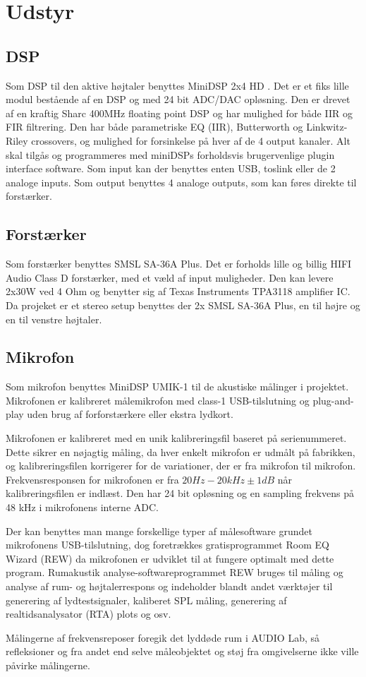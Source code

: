 \section{Udstyr}
\subsection{DSP}
Som DSP til den aktive højtaler benyttes MiniDSP 2x4 HD \cite{dsp}. Det er et fiks lille modul bestående af en DSP og med 24 bit ADC/DAC opløsning. Den er drevet af en kraftig Sharc 400MHz floating point DSP og har mulighed for både IIR og FIR filtrering. Den har både parametriske EQ (IIR), Butterworth og Linkwitz-Riley crossovers, og mulighed for forsinkelse på hver af de 4 output kanaler. Alt skal tilgås og programmeres med miniDSPs forholdsvis brugervenlige plugin interface software.
Som input kan der benyttes enten USB, toslink eller de 2 analoge inputs. Som output benyttes 4 analoge outputs, som kan føres direkte til forstærker.

\subsection{Forstærker}
Som forstærker benyttes SMSL SA-36A Plus\cite{amplifier}. Det  er forholds lille og billig HIFI Audio Class D forstærker, med et væld af input muligheder. Den kan levere 2x30W ved 4 Ohm og benytter sig af Texas Instruments TPA3118 amplifier IC.
Da projeket er et stereo setup benyttes der 2x SMSL SA-36A Plus, en til højre og en til venstre højtaler.  


\subsection{Mikrofon}
Som mikrofon  benyttes MiniDSP UMIK-1 \cite{mikrofon} til de akustiske målinger i projektet. Mikrofonen er kalibreret målemikrofon med class-1 USB-tilslutning og  plug-and-play uden brug af forforstærkere eller ekstra lydkort. 

Mikrofonen er kalibreret med en unik kalibreringsfil baseret på serienummeret. Dette sikrer en nøjagtig måling, da hver enkelt mikrofon er udmålt på fabrikken, og kalibreringsfilen korrigerer for de variationer, der er fra mikrofon til mikrofon. Frekvensresponsen for mikrofonen er fra $ 20Hz - 20kHz \pm1dB $ når kalibreringsfilen er indlæst. Den har 24 bit opløsning og en sampling frekvens på 48 kHz i mikrofonens interne ADC.

Der kan benyttes man mange forskellige typer af målesoftware grundet mikrofonens USB-tilslutning, dog foretrækkes gratisprogrammet Room EQ Wizard (REW) da mikrofonen er udviklet til at fungere optimalt med dette program. Rumakustik analyse-softwareprogrammet REW bruges til måling og analyse af rum- og højtalerrespons og indeholder blandt andet værktøjer til generering af lydtestsignaler, kaliberet SPL måling, generering af realtidsanalysator (RTA) plots og osv. 

Målingerne af frekvensreposer foregik  det lyddøde rum i AUDIO Lab, så  refleksioner og fra andet end selve måleobjektet og støj fra omgivelserne ikke ville påvirke målingerne.

